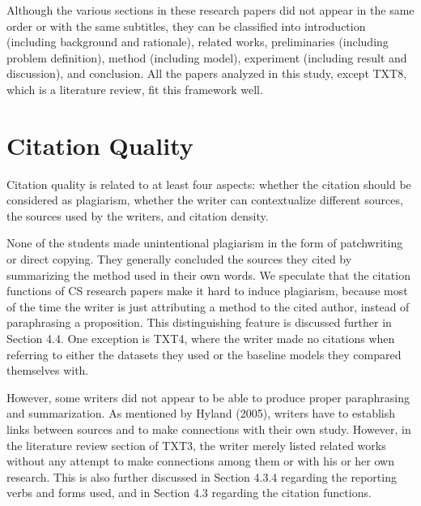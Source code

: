 Although the various sections in these research papers did not appear in the same order or with the same subtitles, they can be classified into introduction (including background and rationale), related works, preliminaries (including problem definition), method (including model), experiment (including result and discussion), and conclusion. All the papers analyzed in this study, except TXT8, which is a literature review, fit this framework well.

\section{Citation Quality}
Citation quality is related to at least four aspects: whether the citation should be considered as plagiarism, whether the writer can contextualize different sources, the sources used by the writers, and citation density.

None of the students made unintentional plagiarism in the form of patchwriting or direct copying. They generally concluded the sources they cited by summarizing the method used in their own words. We speculate that the citation functions of CS research papers make it hard to induce plagiarism, because most of the time the writer is just attributing a method to the cited author, instead of paraphrasing a proposition. This distinguishing feature is discussed further in Section 4.4. One exception is TXT4, where the writer made no citations when referring to either the datasets they used or the baseline models they compared themselves with.

However, some writers did not appear to be able to produce proper paraphrasing and summarization. As mentioned by Hyland (2005), writers have to establish links between sources and to make connections with their own study. However, in the literature review section of TXT3, the writer merely listed related works without any attempt to make connections among them or with his or her own research. This is also further discussed in Section 4.3.4 regarding the reporting verbs and forms used, and in Section 4.3 regarding the citation functions.

